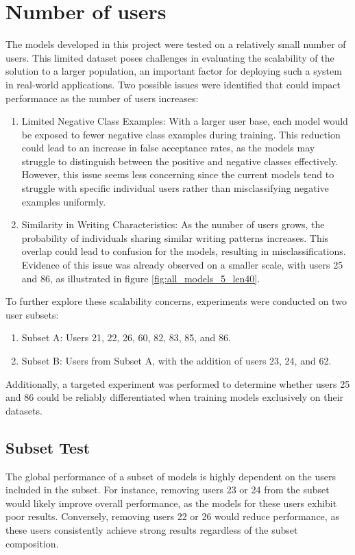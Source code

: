 \section{Number of users}
The models developed in this project were tested on a relatively small number of users. This limited dataset poses challenges in evaluating the scalability of the solution to a larger population, an important factor for deploying such a system in real-world applications. Two possible issues were identified that could impact performance as the number of users increases:
\begin{enumerate}
	\item Limited Negative Class Examples: With a larger user base, each model would be exposed to fewer negative class examples during training. This reduction could lead to an increase in false acceptance rates, as the models may struggle to distinguish between the positive and negative classes effectively.  However, this issue seems less concerning since the current models tend to struggle with specific individual users rather than misclassifying negative examples uniformly.
	
	\item Similarity in Writing Characteristics: As the number of users grows, the probability of individuals sharing similar writing patterns increases. This overlap could lead to confusion for the models, resulting in misclassifications. Evidence of this issue was already observed on a smaller scale, with users 25 and 86, as illustrated in figure \ref{fig:all_models_5_len40}.
\end{enumerate}

To further explore these scalability concerns, experiments were conducted on two user subsets:
\begin{enumerate}
	\item Subset A: Users 21, 22, 26, 60, 82, 83, 85, and 86.
	\item Subset B: Users from Subset A, with the addition of users 23, 24, and 62.
\end{enumerate}

Additionally, a targeted experiment was performed to determine whether users 25 and 86 could be reliably differentiated when training models exclusively on their datasets.


\subsection{Subset Test}
The global performance of a subset of models is highly dependent on the users included in the subset. For instance, removing users 23 or 24 from the subset would likely improve overall performance, as the models for these users exhibit poor results. Conversely, removing users 22 or 26 would reduce performance, as these users consistently achieve strong results regardless of the subset composition.

